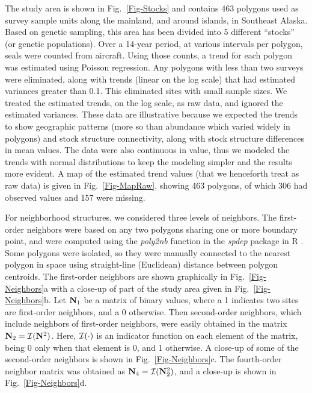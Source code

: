 \documentclass[11pt, titlepage]{article}\usepackage[]{graphicx}\usepackage[]{color}
\begin{document}
\begin{spacing}{1.9}
\begin{flushleft}
The study area is shown in Fig.~\ref{Fig-Stocks} and contains 463 polygons used as survey sample units along the mainland, and around islands, in Southeast Alaska.  Based on genetic sampling, this area has been divided into 5 different ``stocks'' (or genetic populations). Over a 14-year period, at various intervals per polygon, seals were counted from aircraft.  Using those counts, a trend for each polygon was estimated using Poisson regression.  Any polygons with less than two surveys were eliminated, along with trends (linear on the log scale) that had estimated variances greater than 0.1.  This eliminated sites with small sample sizes.  We treated the estimated trends, on the log scale, as raw data, and ignored the estimated variances.  These data are illustrative because we expected the trends to show geographic patterns (more so than abundance which varied widely in polygons) and stock structure connectivity, along with stock structure differences in mean values. The data were also continuous in value, thus we modeled the trends with normal distributions to keep the modeling simpler and the results more evident.  A map of the estimated trend values (that we henceforth treat as raw data) is given in Fig.~\ref{Fig-MapRaw}, showing 463 polygons, of which 306 had observed values and 157 were missing.

For neighborhood structures, we considered three levels of neighbors.  The first-order neighbors were based on any two polygons sharing one or more boundary point, and were computed using the \emph{poly2nb} function in the \emph{spdep} package \citep{Biva:Pira:comp:2015} in R \citep{R:Deve:Core:ALan:2016}. Some polygons were isolated, so they were manually connected to the nearest polygon in space using straight-line (Euclidean) distance between polygon centroids.  The first-order neighbors are shown graphically in Fig.~\ref{Fig-Neighbors}a with a close-up of part of the study area given in Fig.~\ref{Fig-Neighbors}b.  Let $\mathbf{N}_1$ be a matrix of binary values, where a 1 indicates two sites are first-order neighbors, and a 0 otherwise. Then second-order neighbors, which include neighbors of first-order neighbors, were easily obtained in the matrix $\mathbf{N}_2 = \mathcal{I}(\mathbf{N}^2)$. Here, $\mathcal{I}(\cdot)$ is an indicator function on each element of the matrix, being 0 only when that element is 0, and 1 otherwise. A close-up of some of the second-order neighbors is shown in Fig.~\ref{Fig-Neighbors}c. The fourth-order neighbor matrix was obtained as $\mathbf{N}_4 = \mathcal{I}(\mathbf{N}_2^2)$, and a close-up is shown in Fig.~\ref{Fig-Neighbors}d.


\end{flushleft}
\end{spacing}
\end{document}
